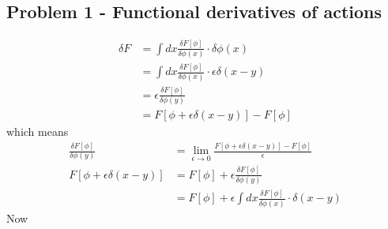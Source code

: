 \documentclass[../main.tex]{subfiles}
\begin{document}
\subsection{Problem 1 - Functional derivatives of actions}
\begin{align}
    \delta F
    &=\int dx \frac{\delta F[\phi]}{\delta\phi(x)}\cdot\delta\phi(x)\\
    &=\int dx \frac{\delta F[\phi]}{\delta\phi(x)}\cdot\epsilon\delta(x-y)\\
    &=\epsilon\frac{\delta F[\phi]}{\delta\phi(y)}\\
    &=F[\phi+\epsilon\delta(x-y)]-F[\phi]
\end{align}
which means
\begin{align}
    \frac{\delta F[\phi]}{\delta\phi(y)}&=\lim_{\epsilon\rightarrow0}\frac{F[\phi+\epsilon\delta(x-y)]-F[\phi]}{\epsilon}\\
    F[\phi+\epsilon\delta(x-y)]&=F[\phi]+\epsilon\frac{\delta F[\phi]}{\delta\phi(y)}\\
    &=F[\phi]+\epsilon\int dx \frac{\delta F[\phi]}{\delta\phi(x)}\cdot\delta(x-y)
\end{align}
Now
\end{document}

